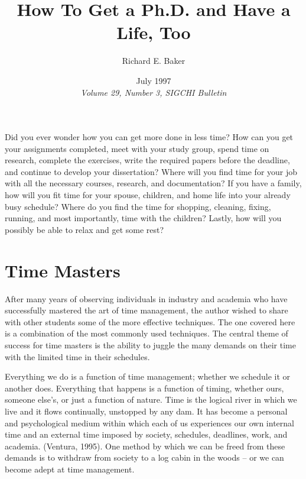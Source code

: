 \documentclass[twocolumn]{article}
\title{How To Get a Ph.D. and Have a Life, Too}
\author{Richard E. Baker}
\date{July 1997 \\\textit{Volume 29, Number 3, SIGCHI Bulletin}}
\begin{document}
\maketitle




\noindent
Did you ever wonder how you can get more done in less time? How can you get your
assignments completed, meet with your study group, spend time on research,
complete the exercises, write the required papers before the deadline, and
continue to develop your dissertation? Where will you find time for your job with
all the necessary courses, research, and documentation? If you have a family, how
will you fit time for your spouse, children, and home life into your already busy
schedule? Where do you find the time for shopping, cleaning, fixing, running, and
most importantly, time with the children? Lastly, how will you possibly be able
to relax and get some rest?

\section*{Time Masters}
\noindent
After many years of observing individuals in industry and academia who have
successfully mastered the art of time management, the author wished to share with
other students some of the more effective techniques. The one covered here is a
combination of the most commonly used techniques. The central theme of success for
time masters is the ability to juggle the many demands on their time with the
limited time in their schedules.

Everything we do is a function of time management; whether we schedule it or
another does. Everything that happens is a function of timing, whether ours,
someone else's, or just a function of nature. Time is the logical river in which
we live and it flows continually, unstopped by any dam. It has become a personal
and psychological medium within which each of us experiences our own internal
time and an external time imposed by society, schedules, deadlines, work, and
academia. (Ventura, 1995). One method by which we can be freed from these demands
is to withdraw from society to a log cabin in the woods – or we can become adept
at time management.
\end{document}
